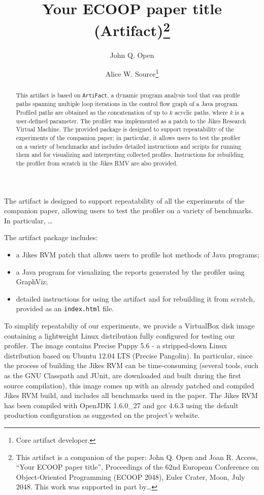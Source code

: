 \documentclass[a4paper,UKenglish]{lipics-v2016}
\title{Your ECOOP paper title (Artifact)\footnote{This artifact is a companion of the paper:  John Q. Open and Joan R. Access, ``Your ECOOP paper title'', Proceedings of the 62nd European Conference on Object-Oriented Programming (ECOOP 2048), Euler Crater, Moon, July 2048. This work was supported in part by\ldots}}
\author[1]{John Q. Open}
\author[2]{Alice W. Source\footnote{Core artifact developer.}}
\affil[1]{Dummy University Computing Laboratory, Address/City, Country\\
  \texttt{open@dummyuniversity.org}}
\affil[2]{Department of Informatics, Dummy College, Address/City, Country\\
  \texttt{access@dummycollege.org}}
\begin{document}
\maketitle

\begin{abstract}
  This artifact is based on {\tt ArtiFact}, a dynamic program analysis tool that
  can profile paths spanning multiple loop iterations in the control flow
  graph of a Java program. Profiled paths are obtained as the concatenation of
  up to $k$ acyclic paths, where $k$ is a user-defined parameter. The profiler was
  implemented as a patch to the Jikes Research Virtual Machine. The provided
  package is designed to support repeatability of the experiments of the
  companion paper: in particular, it allows users to test the profiler on a variety of
  benchmarks and includes detailed instructions and scripts for running them
  and for visualizing and interpreting collected profiles. Instructions for
  rebuilding the profiler from scratch in the Jikes RMV are also provided.
 \end{abstract}


\begin{scope}
  The artifact is designed to support repeatability of all the experiments of the 
  companion paper, allowing users to test the profiler on a variety of benchmarks. In particular, \ldots
\end{scope}

\begin{content}
  The artifact package includes:
  \begin{itemize}
  \item a Jikes RVM patch that allows users to profile hot methods of Java programs;
  \item a Java program for visualizing the reports generated by the profiler using GraphViz;
  \item detailed instructions for using the artifact and for rebuilding it from scratch, provided as an {\tt index.html} file.
  \end{itemize}
  To simplify repeatabiliy of our experiments, we provide a VirtualBox disk
  image containing a lightweight Linux distribution fully configured for
  testing our profiler. The image contains Precise Puppy 5.6 - a stripped-down
  Linux distribution based on Ubuntu 12.04 LTS (Precise Pangolin). In
  particular, since the process of building the Jikes RVM can be
  time-consuming (several tools, such as the GNU Classpath and JUnit, are
  downloaded and built during the first source compilation), this image comes
  up with an already patched and compiled Jikes RVM build, and includes all
  benchmarks used in the paper. The Jikes RVM has been compiled with OpenJDK
  1.6.0\_27 and gcc 4.6.3 using the default production configuration as
  suggested on the project's website. 
\end{content} 
\end{document}
